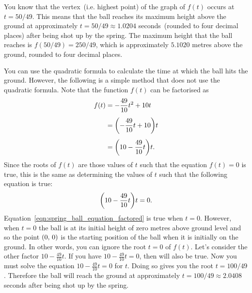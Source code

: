 \documentclass[a4paper,oneside,12pt]{article}
\begin{document}
\begin{solution}
You know that the vertex~(i.e. highest point) of the graph of $f(t)$
occurs at $t = 50/49$.  This means that the ball reaches its maximum
height above the ground at approximately $t = 50/49 \approx 1.0204$
seconds~(rounded to four decimal places) after being shot up by the
spring.  The maximum height that the ball reaches is
$f(50 / 49) = 250 / 49$, which is approximately $5.1020$ metres above
the ground, rounded to four decimal places.

You can use the quadratic formula to calculate the time at which the
ball hits the ground.  However, the following is a simple method that
does not use the quadratic formula.  Note that the function $f(t)$ can
be factorised as
\begin{align*}
f(t)
&=
-\frac{49}{10} t^2 + 10t \\[4pt]
&=
\parenthesis*{-\frac{49}{10} t + 10} t \\[4pt]
&=
\parenthesis*{10 - \frac{49}{10} t} t.
\end{align*}
Since the roots of $f(t)$ are those values of $t$ such that the
equation $f(t) = 0$ is true, this is the same as determining the
values of $t$ such that the following equation is true:
\begin{equation}
\label{eqn:spring_ball_equation_factored}
\parenthesis*{10 - \frac{49}{10} t} t
=
0.
\end{equation}
Equation~\eqref{eqn:spring_ball_equation_factored} is true when
$t = 0$.  However, when $t = 0$ the ball is at its initial height of
zero metres above ground level and so the point $\left\lparen{0},\, {0}\right\rparen$ is the
starting position of the ball when it is initially on the ground.  In
other words, you can ignore the root $t = 0$ of $f(t)$.  Let's
consider the other factor $10 - \frac{49}{10} t$.  If you have
$10 - \frac{49}{10} t = 0$, then
 will also be true.  Now
you must solve the equation $10 - \frac{49}{10} t = 0$ for $t$.  Doing
so gives you the root $t = 100 / 49$.  Therefore the ball will reach
the ground at approximately $t = 100 / 49 \approx 2.0408$ seconds
after being shot up by the spring.
\end{solution}
\end{document}
